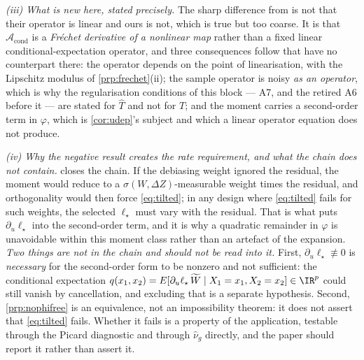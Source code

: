 \begin{remark}
\emph{(iii) What is new here, stated precisely.} The sharp difference from \citet{feve2014} is not that
their operator is linear and ours is not, which is true but too coarse. It is that
$\mathcal A_{\mathrm{cond}}$ is a \emph{Fr\'echet derivative of a nonlinear map} rather than a fixed
linear conditional-expectation operator, and three consequences follow that have no counterpart there:
the operator depends on the point of linearisation, with the Lipschitz modulus of
\cref{prp:frechet}(ii); the sample operator is noisy \emph{as an operator}, which is why the
regularisation conditions of this block --- A7, and the retired A6 before it --- are stated for
$\hat T$ and not for $T$; and the moment carries a second-order term in $\varphi$, which is
\cref{cor:udep}'s subject and which a linear operator equation does not produce.

\emph{(iv) Why the negative result creates the rate requirement, and what the chain does not contain.}
 closes the chain. If the debiasing weight ignored the residual, the moment would reduce
to a $\sigma(W,\Delta Z)$-measurable weight times the residual, and orthogonality would then force
\eqref{eq:tilted}; in any design where \eqref{eq:tilted} fails for such weights, the selected
$\ell_\star$ must vary with the residual. That is what puts $\partial_u\ell_\star$ into the second-order
term, and it is why a quadratic remainder in $\varphi$ is unavoidable within this moment class rather
than an artefact of the expansion. \emph{Two things are not in the chain and should not be read into it.}
First, $\partial_u\ell_\star\not\equiv0$ is \emph{necessary} for the second-order form to be nonzero and
not sufficient: the conditional expectation
$q(x_1,x_2)=E[\partial_u\ell_\star\,\widetilde W\mid X_1=x_1,X_2=x_2]\in\IR^{p}$ could still vanish by cancellation,
and excluding that is a separate hypothesis. Second, \cref{prp:nophifree} is an equivalence, not an
impossibility theorem: it does not assert that \eqref{eq:tilted} fails. Whether it fails is a property of
the application, testable through the Picard diagnostic and through $\hat\nu_g$ directly, and the paper
should report it rather than assert it.


\end{remark}
